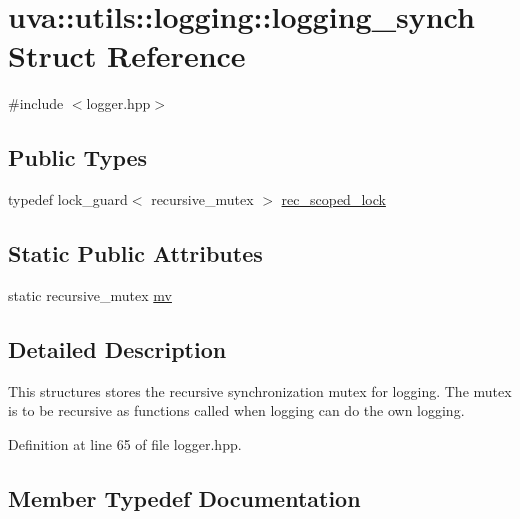 \hypertarget{structuva_1_1utils_1_1logging_1_1logging__synch}{}\section{uva\+:\+:utils\+:\+:logging\+:\+:logging\+\_\+synch Struct Reference}
\label{structuva_1_1utils_1_1logging_1_1logging__synch}


{\ttfamily \#include $<$logger.\+hpp$>$}

\subsection*{Public Types}
\begin{DoxyCompactItemize}
\item 
typedef lock\+\_\+guard$<$ recursive\+\_\+mutex $>$ \hyperlink{structuva_1_1utils_1_1logging_1_1logging__synch_afaab265627f1f072fbfd927b6d2b6cb6}{rec\+\_\+scoped\+\_\+lock}
\end{DoxyCompactItemize}
\subsection*{Static Public Attributes}
\begin{DoxyCompactItemize}
\item 
static recursive\+\_\+mutex \hyperlink{structuva_1_1utils_1_1logging_1_1logging__synch_a85128bbf4931fcdd13b8b804e1789580}{mv}
\end{DoxyCompactItemize}


\subsection{Detailed Description}
This structures stores the recursive synchronization mutex for logging. The mutex is to be recursive as functions called when logging can do the own logging. 

Definition at line 65 of file logger.\+hpp.



\subsection{Member Typedef Documentation}
\hypertarget{structuva_1_1utils_1_1logging_1_1logging__synch_afaab265627f1f072fbfd927b6d2b6cb6}{}
